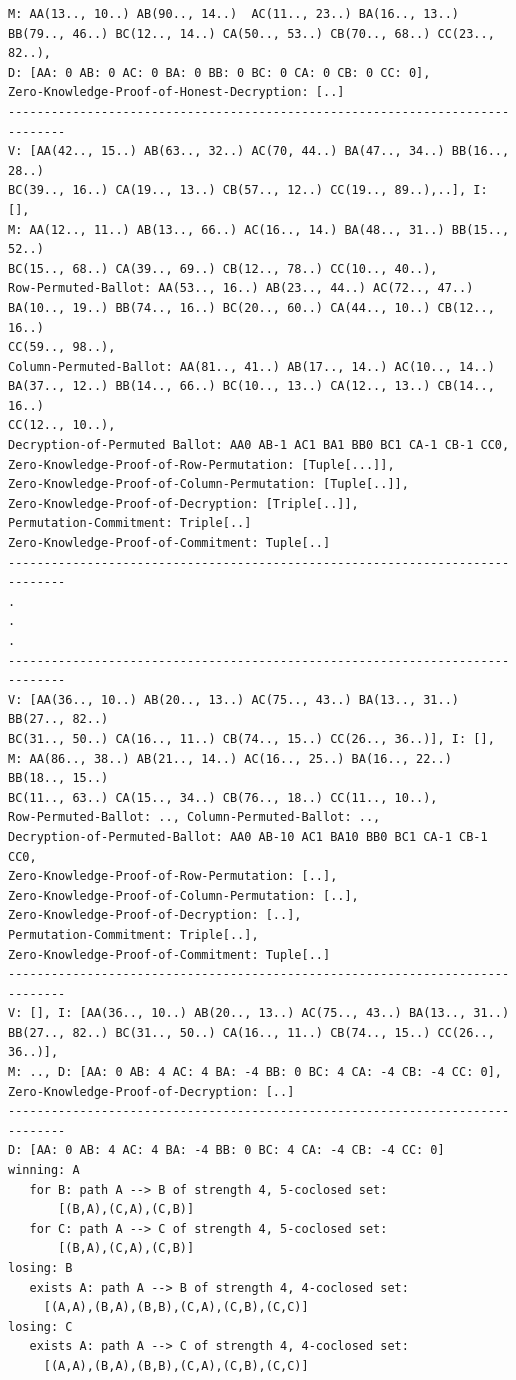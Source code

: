 \documentclass{llncs}
\begin{document}
\begin{lstlisting}[frame=single,basicstyle=\ttfamily\scriptsize]
M: AA(13.., 10..) AB(90.., 14..)  AC(11.., 23..) BA(16.., 13..) 
BB(79.., 46..) BC(12.., 14..) CA(50.., 53..) CB(70.., 68..) CC(23.., 82..), 
D: [AA: 0 AB: 0 AC: 0 BA: 0 BB: 0 BC: 0 CA: 0 CB: 0 CC: 0], 
Zero-Knowledge-Proof-of-Honest-Decryption: [..]
------------------------------------------------------------------------------
V: [AA(42.., 15..) AB(63.., 32..) AC(70, 44..) BA(47.., 34..) BB(16.., 28..)
BC(39.., 16..) CA(19.., 13..) CB(57.., 12..) CC(19.., 89..),..], I:  [], 
M: AA(12.., 11..) AB(13.., 66..) AC(16.., 14.) BA(48.., 31..) BB(15.., 52..)
BC(15.., 68..) CA(39.., 69..) CB(12.., 78..) CC(10.., 40..),
Row-Permuted-Ballot: AA(53.., 16..) AB(23.., 44..) AC(72.., 47..) 
BA(10.., 19..) BB(74.., 16..) BC(20.., 60..) CA(44.., 10..) CB(12.., 16..)
CC(59.., 98..),
Column-Permuted-Ballot: AA(81.., 41..) AB(17.., 14..) AC(10.., 14..) 
BA(37.., 12..) BB(14.., 66..) BC(10.., 13..) CA(12.., 13..) CB(14.., 16..)
CC(12.., 10..),
Decryption-of-Permuted Ballot: AA0 AB-1 AC1 BA1 BB0 BC1 CA-1 CB-1 CC0,
Zero-Knowledge-Proof-of-Row-Permutation: [Tuple[...]], 
Zero-Knowledge-Proof-of-Column-Permutation: [Tuple[..]], 
Zero-Knowledge-Proof-of-Decryption: [Triple[..]], 
Permutation-Commitment: Triple[..]
Zero-Knowledge-Proof-of-Commitment: Tuple[..]
------------------------------------------------------------------------------
.
.
.
------------------------------------------------------------------------------
V: [AA(36.., 10..) AB(20.., 13..) AC(75.., 43..) BA(13.., 31..) BB(27.., 82..)
BC(31.., 50..) CA(16.., 11..) CB(74.., 15..) CC(26.., 36..)], I: [],
M: AA(86.., 38..) AB(21.., 14..) AC(16.., 25..) BA(16.., 22..) BB(18.., 15..)
BC(11.., 63..) CA(15.., 34..) CB(76.., 18..) CC(11.., 10..), 
Row-Permuted-Ballot: .., Column-Permuted-Ballot: .., 
Decryption-of-Permuted-Ballot: AA0 AB-10 AC1 BA10 BB0 BC1 CA-1 CB-1 CC0,
Zero-Knowledge-Proof-of-Row-Permutation: [..],
Zero-Knowledge-Proof-of-Column-Permutation: [..], 
Zero-Knowledge-Proof-of-Decryption: [..], 
Permutation-Commitment: Triple[..], 
Zero-Knowledge-Proof-of-Commitment: Tuple[..]
------------------------------------------------------------------------------
V: [], I: [AA(36.., 10..) AB(20.., 13..) AC(75.., 43..) BA(13.., 31..) 
BB(27.., 82..) BC(31.., 50..) CA(16.., 11..) CB(74.., 15..) CC(26.., 36..)], 
M: .., D: [AA: 0 AB: 4 AC: 4 BA: -4 BB: 0 BC: 4 CA: -4 CB: -4 CC: 0],
Zero-Knowledge-Proof-of-Decryption: [..]
------------------------------------------------------------------------------
D: [AA: 0 AB: 4 AC: 4 BA: -4 BB: 0 BC: 4 CA: -4 CB: -4 CC: 0]
winning: A
   for B: path A --> B of strength 4, 5-coclosed set: 
       [(B,A),(C,A),(C,B)]
   for C: path A --> C of strength 4, 5-coclosed set:
       [(B,A),(C,A),(C,B)] 
losing: B
   exists A: path A --> B of strength 4, 4-coclosed set: 
     [(A,A),(B,A),(B,B),(C,A),(C,B),(C,C)]
losing: C
   exists A: path A --> C of strength 4, 4-coclosed set: 
     [(A,A),(B,A),(B,B),(C,A),(C,B),(C,C)]

\end{lstlisting}
\end{document}
